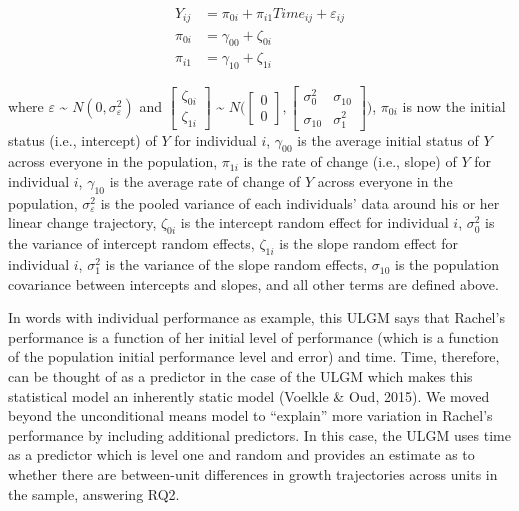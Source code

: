 \documentclass[english,,man]{apa6}
\theoremstyle{definition}
\theoremstyle{definition}
\theoremstyle{definition}
\theoremstyle{remark}
\begin{document}
\begin{align}
\label{ULGM}
Y_{ij} &= \pi_{0i} + \pi_{i1}Time_{ij} + \varepsilon_{ij} \\
\pi_{0i} &= \gamma_{00} + \zeta_{0i} \\
\pi_{i1} &= \gamma_{10} + \zeta_{1i}
\end{align}

\noindent \noindent where \(\varepsilon\) \textasciitilde{}
\(N(0, \sigma_{\varepsilon}^2)\) and
\(\begin{bmatrix} \zeta_{0i} \\ \zeta_{1i} \end{bmatrix}\)
\textasciitilde{}
\(N\bigl(\begin{bmatrix} 0 \\ 0 \end{bmatrix}, \begin{bmatrix} \sigma_{0}^2 & \sigma_{10} \\ \sigma_{10} & \sigma_{1}^2\end{bmatrix}\bigr)\),
\(\pi_{0i}\) is now the initial status (i.e., intercept) of \(Y\) for
individual \(i\), \(\gamma_{00}\) is the average initial status of \(Y\)
across everyone in the population, \(\pi_{1i}\) is the rate of change
(i.e., slope) of \(Y\) for individual \(i\), \(\gamma_{10}\) is the
average rate of change of \(Y\) across everyone in the population,
\(\sigma_{\varepsilon}^2\) is the pooled variance of each individuals'
data around his or her linear change trajectory, \(\zeta_{0i}\) is the
intercept random effect for individual \(i\), \(\sigma_{0}^2\) is the
variance of intercept random effects, \(\zeta_{1i}\) is the slope random
effect for individual \(i\), \(\sigma_1^2\) is the variance of the slope
random effects, \(\sigma_{10}\) is the population covariance between
intercepts and slopes, and all other terms are defined above.

In words with individual performance as example, this ULGM says that
Rachel's performance is a function of her initial level of performance
(which is a function of the population initial performance level and
error) and time. Time, therefore, can be thought of as a predictor in
the case of the ULGM which makes this statistical model an inherently
static model (Voelkle \& Oud, 2015). We moved beyond the unconditional
means model to \enquote{explain} more variation in Rachel's performance
by including additional predictors. In this case, the ULGM uses time as
a predictor which is level one and random and provides an estimate as to
whether there are between-unit differences in growth trajectories across
units in the sample, answering RQ2.
\end{document}
